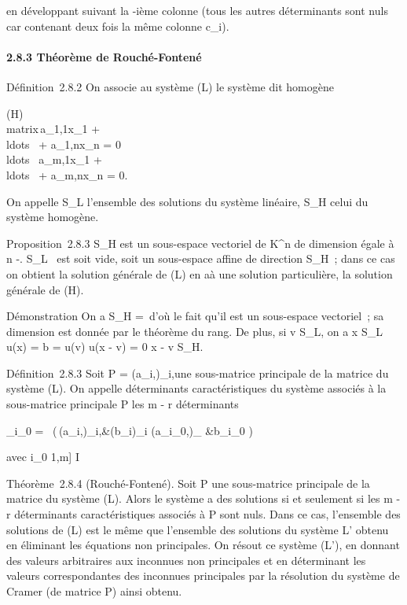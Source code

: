 \documentclass[]{article}
\begin{document}
en développant suivant la \jmath-ième colonne (tous les autres déterminants
sont nuls car contenant deux fois la même colonne c\_i).

\paragraph{2.8.3 Théorème de Rouché-Fontené}

Définition~2.8.2 On associe au système (L) le système dit homogène

(H)\quad \left
\\matrix\,a\_1,1x\_1
+ \\ldots~ +
a\_1,nx\_n = 0 \cr
\\ldots~
\cr a\_m,1x\_1 +
\\ldots~ +
a\_m,nx\_n = 0\right .

On appelle S\_L l'ensemble des solutions du système linéaire,
S\_H celui du système homogène.

Proposition~2.8.3 S\_H est un sous-espace vectoriel de
K^n de dimension égale à n
-\mathrmrgL. S\_L~
est soit vide, soit un sous-espace affine de direction S\_H~;
dans ce cas on obtient la solution générale de (L) en a\jmathoutant à une
solution particulière, la solution générale de (H).

Démonstration On a S\_H =\
\mathrmKeru d'où le fait qu'il est un sous-espace
vectoriel~; sa dimension est donnée par le théorème du rang. De plus, si
v \in S\_L, on a x \in S\_L \Leftrightarrow
u(x) = b = u(v) \Leftrightarrow u(x - v) = 0
\Leftrightarrow x - v \in S\_H.

Définition~2.8.3 Soit P = (a\_i,\jmath)\_i\inI,\jmath\inJ une
sous-matrice principale de la matrice du système (L). On appelle
déterminants caractéristiques du système associés à la sous-matrice
principale P les m - r déterminants

\Delta\_i\_0 =\
 \left
(\matrix\,(a\_i,\jmath)\_i\inI,\jmath\inJ&(b\_i)\_i\inI
\cr (a\_i\_0,\jmath)\_\jmath\inJ
&b\_i\_0 \right )

avec i\_0 \in {[}1,m{]} \diagdown I

Théorème~2.8.4 (Rouché-Fontené). Soit P une sous-matrice principale de
la matrice du système (L). Alors le système a des solutions si et
seulement si les m - r déterminants caractéristiques associés à P sont
nuls. Dans ce cas, l'ensemble des solutions de (L) est le même que
l'ensemble des solutions du système L' obtenu en éliminant les équations
non principales. On résout ce système (L'), en donnant des valeurs
arbitraires aux inconnues non principales et en déterminant les valeurs
correspondantes des inconnues principales par la résolution du système
de Cramer (de matrice P) ainsi obtenu.
\end{document}
